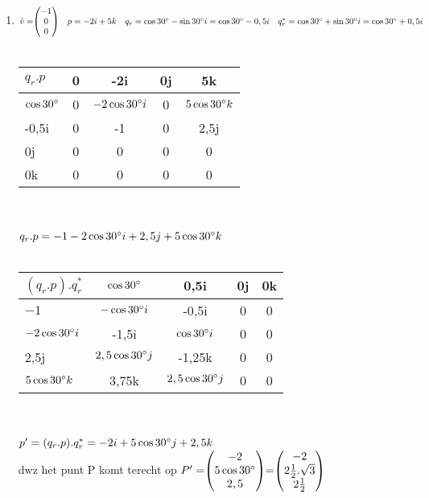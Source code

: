 \documentclass[hidelinks, a4wide, 12pt,  twoside]{book}
\begin{document}
\begin{enumerate}
	\item
	$\hat{v} = \vecdrie{-1}{0}{0} \quad p = -2i +5k   \\
	\quad q_r = \cos 30 \degree -\sin 30 \degree i  =  \cos 30 \degree - 0,5i \\
	\quad q^*_r =  \cos 30 \degree + \sin 30 \degree i  =  \cos 30 \degree + 0,5i $ \\ \\
	\begin{tabular}{ | l || c | c |c |c |}
		\hline
		$ q_r.p $ & 0 & -2i   & 0j & 5k \\ \hline \hline
		$\cos 30 \degree   $  & 0 &  $-2\cos 30 \degree i  $
		&   0    &  $5\cos 30 \degree k  $ \\ \hline
		-0,5i   & 0 &  -1  &   0       & 2,5j  \\ \hline
		0j   & 0 &  0 &   0    & 0\\ \hline
		0k    & 0  & 0   & 0  & 0\\ 
		\hline 
	\end{tabular} \\ \\
	$ q_r.p = -1 -2\cos 30 \degree i  + 2,5j + 5\cos 30 \degree k $\\ \\
	\begin{tabular}{ | l || c | c |c |c |}
		\hline
		$ (q_r.p).q^*_r $ & $ \cos 30 \degree  $ & 0,5i   & 0j & 0k \\ \hline \hline
		$-1   $   &  $-\cos 30 \degree i  $ & -0,5i	&   0    &  0 \\ \hline
		$ -2\cos 30 \degree i  $ & -1,5i &  $ \cos 30 \degree i  $  &0&0\\ \hline
		2,5j   & $ 2,5\cos 30 \degree j  $ &  -1,25k &   0    & 0\\ \hline
		$ 5\cos 30 \degree k  $    & 3,75k  & $ 2,5\cos 30 \degree j  $    & 0  & 0\\ 
		\hline 
	\end{tabular} \\ \\
	$ p' = (q_r.p).q^*_r = -2i + 5\cos 30 \degree j  + 2,5k $\\
	dwz het punt P komt terecht op $ P' = \vecdrie{-2}{5\cos 30 \degree}{2,5}
	= \vecdrie{-2}{2\frac{1}{2}. \sqrt{3}}{2\frac{1}{2}} $
	
	
	
\end{enumerate}
\end{document}
